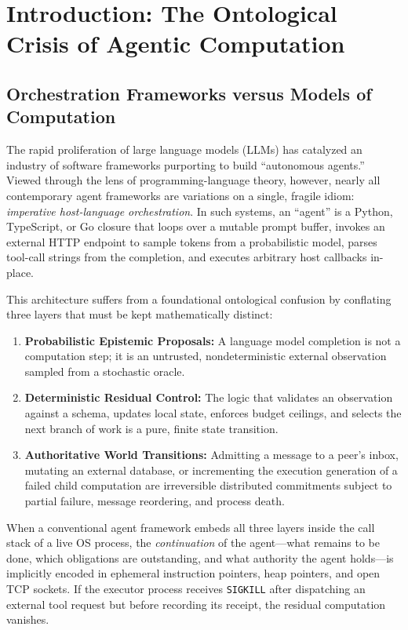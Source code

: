 \documentclass[11pt,a4paper]{article}
\theoremstyle{definition}
\theoremstyle{remark}
\begin{document}
\tableofcontents
\newpage

\section{Introduction: The Ontological Crisis of Agentic Computation}

\subsection{Orchestration Frameworks versus Models of Computation}
The rapid proliferation of large language models (LLMs) has catalyzed an industry of software frameworks purporting to build ``autonomous agents.'' Viewed through the lens of programming-language theory, however, nearly all contemporary agent frameworks are variations on a single, fragile idiom: \emph{imperative host-language orchestration}. In such systems, an ``agent'' is a Python, TypeScript, or Go closure that loops over a mutable prompt buffer, invokes an external HTTP endpoint to sample tokens from a probabilistic model, parses tool-call strings from the completion, and executes arbitrary host callbacks in-place.

This architecture suffers from a foundational ontological confusion by conflating three layers that must be kept mathematically distinct:
\begin{enumerate}
  \item \textbf{Probabilistic Epistemic Proposals:} A language model completion is not a computation step; it is an untrusted, nondeterministic external observation sampled from a stochastic oracle.
  \item \textbf{Deterministic Residual Control:} The logic that validates an observation against a schema, updates local state, enforces budget ceilings, and selects the next branch of work is a pure, finite state transition.
  \item \textbf{Authoritative World Transitions:} Admitting a message to a peer's inbox, mutating an external database, or incrementing the execution generation of a failed child computation are irreversible distributed commitments subject to partial failure, message reordering, and process death.
\end{enumerate}

When a conventional agent framework embeds all three layers inside the call stack of a live OS process, the \emph{continuation} of the agent---what remains to be done, which obligations are outstanding, and what authority the agent holds---is implicitly encoded in ephemeral instruction pointers, heap pointers, and open TCP sockets. If the executor process receives \texttt{SIGKILL} after dispatching an external tool request but before recording its receipt, the residual computation vanishes.
\end{document}
